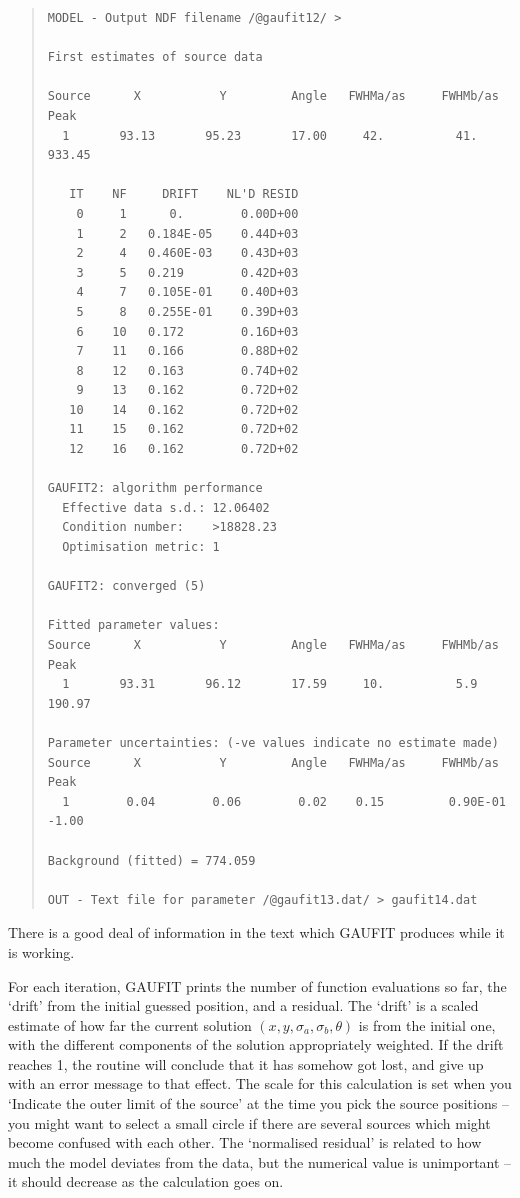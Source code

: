 \documentclass[twoside,11pt]{article}
\newenvironment{myquote}{\begin{quote}\begin{small}}{\end{small}\end{quote}}
\begin{document}
\begin{myquote}
\begin{verbatim}
MODEL - Output NDF filename /@gaufit12/ > 

First estimates of source data

Source      X           Y         Angle   FWHMa/as     FWHMb/as         Peak
  1       93.13       95.23       17.00     42.          41.           933.45

   IT    NF     DRIFT    NL'D RESID
    0     1      0.        0.00D+00
    1     2   0.184E-05    0.44D+03
    2     4   0.460E-03    0.43D+03
    3     5   0.219        0.42D+03
    4     7   0.105E-01    0.40D+03
    5     8   0.255E-01    0.39D+03
    6    10   0.172        0.16D+03
    7    11   0.166        0.88D+02
    8    12   0.163        0.74D+02
    9    13   0.162        0.72D+02
   10    14   0.162        0.72D+02
   11    15   0.162        0.72D+02
   12    16   0.162        0.72D+02

GAUFIT2: algorithm performance
  Effective data s.d.: 12.06402
  Condition number:    >18828.23
  Optimisation metric: 1

GAUFIT2: converged (5)

Fitted parameter values:
Source      X           Y         Angle   FWHMa/as     FWHMb/as         Peak
  1       93.31       96.12       17.59     10.          5.9           190.97

Parameter uncertainties: (-ve values indicate no estimate made)
Source      X           Y         Angle   FWHMa/as     FWHMb/as         Peak
  1        0.04        0.06        0.02    0.15         0.90E-01        -1.00

Background (fitted) = 774.059

OUT - Text file for parameter /@gaufit13.dat/ > gaufit14.dat
\end{verbatim}
\end{myquote}

There is a good deal of information in the text which GAUFIT produces
while it is working.

For each iteration, GAUFIT prints the number of function evaluations
so far, the `drift' from the initial guessed position, and a
residual.  The `drift' is a scaled estimate of how far the current
solution $(x,y,\sigma_a,\sigma_b,\theta)$ is from the initial one,
with the different components of the solution appropriately weighted.
If the drift reaches 1, the routine will conclude that it has somehow
got lost, and give up with an error message to that effect. The scale
for this calculation is set when you `Indicate the outer limit of the
source' at the time you pick the source positions -- you might want to
select a small circle if there are several sources which might become
confused with each other.  The `normalised residual' is related to how
much the model deviates from the data, but the numerical value is
unimportant -- it should decrease as the calculation goes on.
\end{document}
